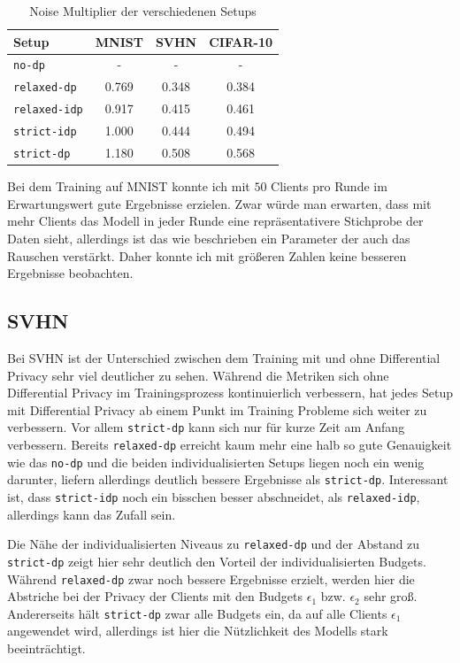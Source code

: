\begin{table}
	\centering
	\begin{tabular}{lccc}
		\toprule
		Setup & MNIST & SVHN & CIFAR-10 \\
		\midrule
		\texttt{no-dp} & - & - & - \\
		\texttt{relaxed-dp} & 0.769 & 0.348 & 0.384 \\
		\texttt{relaxed-idp} & 0.917 & 0.415 & 0.461 \\
		\texttt{strict-idp} & 1.000 & 0.444 & 0.494 \\
		\texttt{strict-dp} & 1.180 & 0.508 & 0.568 \\
		\bottomrule
	\end{tabular}
	\caption{Noise Multiplier der verschiedenen Setups}
	\label{tab:noise-multipliers}
\end{table}

Bei dem Training auf MNIST konnte ich mit $50$ Clients pro Runde im Erwartungswert gute Ergebnisse erzielen. Zwar würde man erwarten, dass mit mehr Clients das Modell in jeder Runde eine repräsentativere Stichprobe der Daten sieht, allerdings ist das wie beschrieben ein Parameter der auch das Rauschen verstärkt. Daher konnte ich mit größeren Zahlen keine besseren Ergebnisse beobachten.

\subsection{SVHN}

Bei SVHN ist der Unterschied zwischen dem Training mit und ohne Differential Privacy sehr viel deutlicher zu sehen. Während die Metriken sich ohne Differential Privacy im Trainingsprozess kontinuierlich verbessern, hat jedes Setup mit Differential Privacy ab einem Punkt im Training Probleme sich weiter zu verbessern. Vor allem \texttt{strict-dp} kann sich nur für kurze Zeit am Anfang verbessern. Bereits \texttt{relaxed-dp} erreicht kaum mehr eine halb so gute Genauigkeit wie das \texttt{no-dp} und die beiden individualisierten Setups liegen noch ein wenig darunter, liefern allerdings deutlich bessere Ergebnisse als \texttt{strict-dp}. Interessant ist, dass \texttt{strict-idp} noch ein bisschen besser abschneidet, als \texttt{relaxed-idp}, allerdings kann das Zufall sein.

Die Nähe der individualisierten Niveaus zu \texttt{relaxed-dp} und der Abstand zu \texttt{strict-dp} zeigt hier sehr deutlich den Vorteil der individualisierten Budgets. Während \texttt{relaxed-dp} zwar noch bessere Ergebnisse erzielt, werden hier die Abstriche bei der Privacy der Clients mit den Budgets $\epsilon_1$ bzw. $\epsilon_2$ sehr groß. Andererseits hält \texttt{strict-dp} zwar alle Budgets ein, da auf alle Clients $\epsilon_1$ angewendet wird, allerdings ist hier die Nützlichkeit des Modells stark beeinträchtigt.

